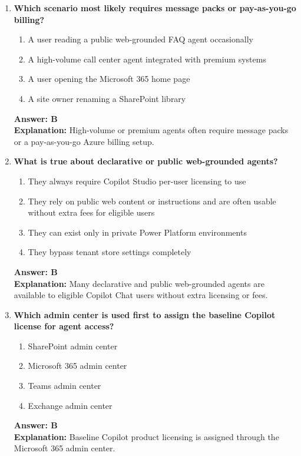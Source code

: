 \documentclass[10pt]{article}
\begin{document}
\begin{enumerate}[leftmargin=*]
\item \textbf{Which scenario most likely requires message packs or pay-as-you-go billing?}
\begin{enumerate}[label=\Alph*.]
  \item A user reading a public web-grounded FAQ agent occasionally
  \item A high-volume call center agent integrated with premium systems
  \item A user opening the Microsoft 365 home page
  \item A site owner renaming a SharePoint library
\end{enumerate}
\textbf{Answer: B}\\
\textbf{Explanation:} High-volume or premium agents often require message packs or a pay-as-you-go Azure billing setup.

\item \textbf{What is true about declarative or public web-grounded agents?}
\begin{enumerate}[label=\Alph*.]
  \item They always require Copilot Studio per-user licensing to use
  \item They rely on public web content or instructions and are often usable without extra fees for eligible users
  \item They can exist only in private Power Platform environments
  \item They bypass tenant store settings completely
\end{enumerate}
\textbf{Answer: B}\\
\textbf{Explanation:} Many declarative and public web-grounded agents are available to eligible Copilot Chat users without extra licensing or fees.

\item \textbf{Which admin center is used first to assign the baseline Copilot license for agent access?}
\begin{enumerate}[label=\Alph*.]
  \item SharePoint admin center
  \item Microsoft 365 admin center
  \item Teams admin center
  \item Exchange admin center
\end{enumerate}
\textbf{Answer: B}\\
\textbf{Explanation:} Baseline Copilot product licensing is assigned through the Microsoft 365 admin center.


\end{enumerate}
\end{document}
